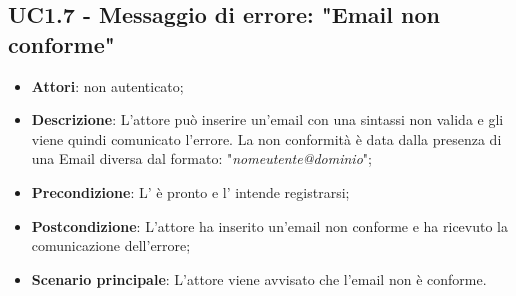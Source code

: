 \subsection{UC1.7 - Messaggio di errore: "Email non conforme"}
\label{ssec:UC1.7}
\begin{itemize}
\item \textbf{Attori}:  non autenticato;
\item \textbf{Descrizione}: L'attore può inserire un'email con una sintassi non valida e gli viene quindi comunicato l'errore. La non conformità è data dalla presenza di una Email diversa dal formato: "\emph{nomeutente@dominio}";
\item \textbf{Precondizione}: L' è pronto e l' intende registrarsi;
\item \textbf{Postcondizione}: L'attore ha inserito un'email non conforme e ha ricevuto la comunicazione dell'errore;
\item \textbf{Scenario principale}: L'attore viene avvisato che l'email non è conforme.
\end{itemize}
\newpage
